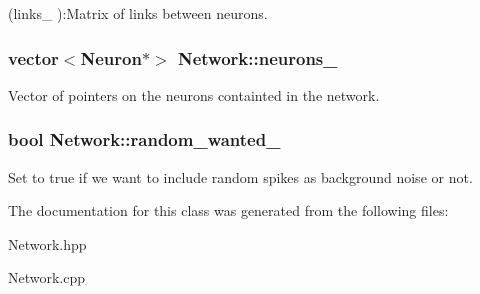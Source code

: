 (links\-\_\- )\-:Matrix of links between neurons. \hypertarget{classNetwork_a6f71e4eb423d2f8fd9cfa8d5f01cb257}{
\subsubsection[{neurons\-\_\-}]{\setlength{\rightskip}{0pt plus 5cm}vector$<${\bf Neuron}$\ast$$>$ Network\-::neurons\-\_\-\hspace{0.3cm}{\ttfamily [private]}}}\label{classNetwork_a6f71e4eb423d2f8fd9cfa8d5f01cb257}
Vector of pointers on the neurons containted in the network. \hypertarget{classNetwork_a4e092c1d6ac94d836db8cc21987cea8b}{
\subsubsection[{random\-\_\-wanted\-\_\-}]{\setlength{\rightskip}{0pt plus 5cm}bool Network\-::random\-\_\-wanted\-\_\-\hspace{0.3cm}{\ttfamily [private]}}}\label{classNetwork_a4e092c1d6ac94d836db8cc21987cea8b}
Set to true if we want to include random spikes as background noise or not. 

The documentation for this class was generated from the following files\-:\begin{DoxyCompactItemize}
\item 
Network.\-hpp\item 
Network.\-cpp\end{DoxyCompactItemize}
